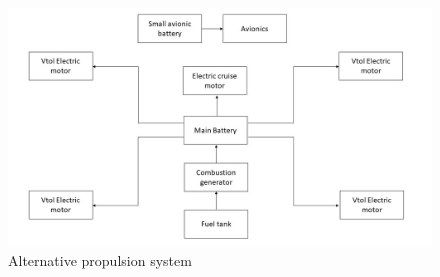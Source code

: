 \documentclass[english,fira]{ist-report}
\begin{document}
\begin{figure}[!h]
	\centering
	\includegraphics[width = 1\linewidth]{graphics/Alternative_propulsion_system.jpg}
	\caption{Alternative propulsion system}
	\label{fig:alternative_propulsion_system}
\end{figure}
\end{document}
